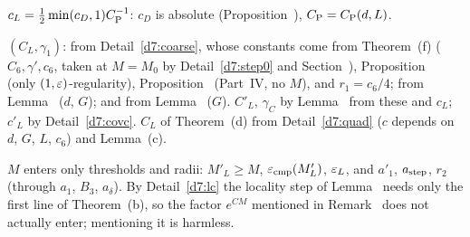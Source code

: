 \begin{detail}\label{d7:stepM}
\begin{step}
$c_L=\frac12\min(c_D,1)C_{\rm P}^{-1}$: $c_D$ is absolute (Proposition~), $C_{\rm P}=C_{\rm P}(d,L)$.
\end{step}
\begin{step}
$(C_L,\gamma_1)$: from Detail~\ref{d7:coarse}, whose constants come from Theorem~(f) ($C_6,\gamma',c_6$, taken at $M=M_0$ by Detail~\ref{d7:step0} and Section~), Proposition~ (only $(1,\varepsilon)$-regularity), Proposition~ (Part~IV, no $M$), and $r_1=c_6/4$; from Lemma~ ($d$, $G$); and from Lemma~ ($G$). $C'_L$, $\gamma_C$ by Lemma~ from these and $c_L$; $c'_L$ by Detail~\ref{d7:covc}. $C_L$ of Theorem~(d) from Detail~\ref{d7:quad} ($c$ depends on $d$, $G$, $L$, $c_6$) and Lemma~(c).
\end{step}
\begin{step}
$M$ enters only thresholds and radii: $M'_L\ge M$, $\varepsilon_{\rm cmp}(M'_L)$, $\varepsilon_L$, and $a'_1$, $a_{\rm step}$, $r_2$ (through $a_1$, $B_3$, $a_\delta$). By Detail~\ref{d7:lc} the locality step of Lemma~ needs only the first line of Theorem~(b), so the factor $e^{CM}$ mentioned in Remark~ does not actually enter; mentioning it is harmless.
\end{step}
\end{detail}

